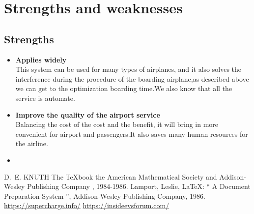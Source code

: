 \documentclass{mcmthesis}
\begin{document}
\section{Strengths and weaknesses}


\subsection{Strengths}
\begin{itemize}
\item \textbf{Applies widely}\\
This  system can be used for many types of airplanes, and it also
solves the interference during  the procedure of the boarding
airplane,as described above we can get to the  optimization
boarding time.We also know that all the service is automate.
\item \textbf{Improve the quality of the airport service}\\
Balancing the cost of the cost and the benefit, it will bring in
more convenient  for airport and passengers.It also saves many
human resources for the airline. 
\item \textbf{}
\end{itemize}

\begin{thebibliography}{99}
 D.~E. KNUTH   The \TeX{}book  the American
Mathematical Society and Addison-Wesley
Publishing Company , 1984-1986.
Lamport, Leslie,  \LaTeX{}: `` A Document Preparation System '',
Addison-Wesley Publishing Company, 1986.
\url{https://supercharge.info/}
\url{https://insideevsforum.com/}
\end{thebibliography}
\end{document}
